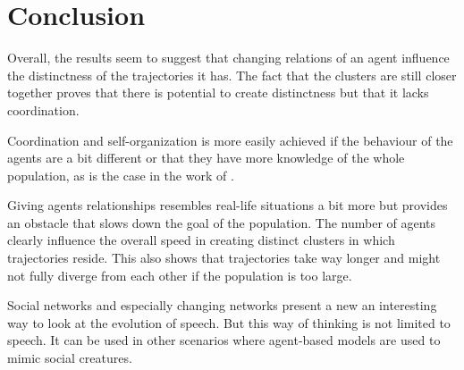 \section{Conclusion}
Overall, the results seem to suggest that changing relations of an agent influence the distinctness of the trajectories it has.
The fact that the clusters are still closer together proves that there is potential to create distinctness but that it lacks coordination.

Coordination and self-organization is more easily achieved if the behaviour of the agents are a bit different or that they have more knowledge of the whole population, as is the case in the work of \cite{de2010multi}.

Giving agents relationships resembles real-life situations a bit more but provides an obstacle that slows down the goal of the population.
The number of agents clearly influence the overall speed in creating distinct clusters in which trajectories reside.
This also shows that trajectories take way longer and might not fully diverge from each other if the population is too large.

Social networks and especially changing networks present a new an interesting way to look at the evolution of speech.
But this way of thinking is not limited to speech.
It can be used in other scenarios where agent-based models are used to mimic social creatures.